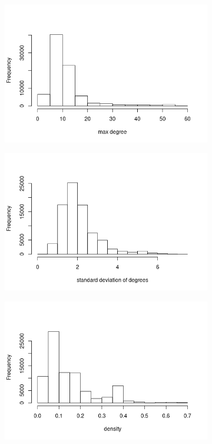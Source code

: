 \documentclass{l4proj}
\theoremstyle{definition}
\theoremstyle{remark}
\begin{document}
\begin{figure}
\begin{subfigure}[t]{0.49\textwidth}
  \end{subfigure}
  \begin{subfigure}[t]{0.49\textwidth}
    \centering
    \includegraphics[width=\textwidth]{images/mcs_maxdeg.png}
  \end{subfigure}
  \begin{subfigure}[t]{0.49\textwidth}
    \centering
    \includegraphics[width=\textwidth]{images/mcs_stddeg.png}
  \end{subfigure}
  \begin{subfigure}[t]{0.49\textwidth}
    \centering
    \includegraphics[width=\textwidth]{images/mcs_density.png}

\end{subfigure}
\end{figure}
\end{document}
